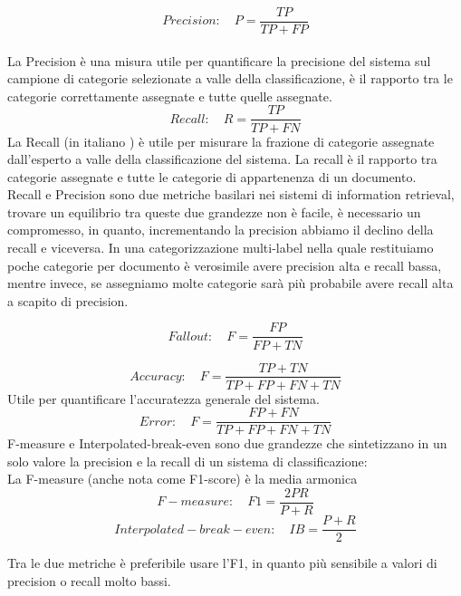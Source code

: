 \documentclass{article}
\theoremstyle{plain}
\theoremstyle{definition}
\begin{document}
\[ Precision: \quad P= \frac{TP}{TP+FP} \]
\\
La Precision è una misura utile per quantificare la precisione del sistema sul campione di categorie selezionate a valle della classificazione, è il rapporto tra le categorie correttamente assegnate e tutte quelle assegnate.
\[ Recall: \quad R= \frac{TP}{TP+FN} \]
La Recall (in italiano ) è utile per misurare la frazione di categorie assegnate dall'esperto a valle della classificazione del sistema. La recall è il rapporto tra categorie assegnate e tutte le categorie di appartenenza di un documento. 
\\
Recall e Precision sono due metriche basilari nei sistemi di information retrieval, trovare un equilibrio tra queste due grandezze non è facile, è necessario un compromesso, in quanto, incrementando la precision abbiamo il declino della recall e viceversa. In una categorizzazione multi-label nella quale restituiamo poche categorie per documento è verosimile avere precision alta e recall bassa, mentre invece, se assegniamo molte categorie sarà più probabile avere recall alta a scapito di precision.


\[ Fallout: \quad F= \frac{FP}{FP+TN} \]

\[ Accuracy: \quad F= \frac{TP+TN}{TP+FP+FN+TN} \]
Utile per quantificare l'accuratezza generale del sistema.
\[ Error: \quad F= \frac{FP+FN}{TP+FP+FN+TN} \]
F-measure e Interpolated-break-even sono due grandezze che sintetizzano in un solo valore la precision e la recall di un sistema di classificazione:
\\
La F-measure (anche nota come F1-score) è la media armonica 
\[ F-measure: \quad F1= \frac{2PR}{P+R} \]
\[ Interpolated-break-even: \quad IB= \frac{P+R}{2} \]

Tra le due metriche è preferibile usare l'F1, in quanto più sensibile a valori di precision o recall molto bassi.
\end{document}
